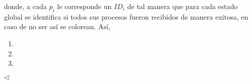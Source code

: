 donde, a cada $p_i$ le corresponde un $ID_i$ de tal manera que
para cada estado global se identifica si todos sus procesos fueron
recibidos de manera exitosa, en caso de no ser así se colorean.
Así,
\begin{enumerate}
\item 
\item 
\item 
\end{enumerate}
\hfill $\lhd$
